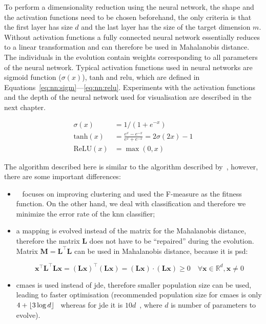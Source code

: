 \documentclass[12pt,a4paper]{report}
\begin{document}
To perform a dimensionality reduction using the neural network, the shape and the activation functions need to be chosen beforehand, the only criteria is that the first layer has size $d$ and the last layer has the size of the target dimension $m$. Without activation functions a fully connected neural network essentially reduces to a linear transformation and can therefore be used in Mahalanobis distance. The individuals in the evolution contain weights corresponding to all parameters of the neural network. Typical activation functions used in neural networks are sigmoid function ($\sigma(x)$), \ac{tanh} and \ac{relu}, which are defined in Equations~\ref{eq:nn:sigm}---\ref{eq:nn:relu}. Experiments with the activation functions and the depth of the neural network used for visualisation are described in the next chapter.

\begin{align}
\sigma(x)      &= 1/(1+e^{-x}) \label{eq:nn:sigm} \\
\text{tanh}(x) &= \frac{e^x-e^{-x}}{e^x+e^{-x}} = 2\sigma(2x)-1 \label{eq:nn:tanh} \\
\text{ReLU}(x) &= \max(0,x) \label{eq:nn:relu}
\end{align}

The algorithm described here is similar to the algorithm described by~\citep{fukui2013evolutionary}, however, there are some important differences:
\begin{itemize}
\item~\citep{fukui2013evolutionary} focuses on improving clustering and used the \mbox{F-measure} as the fitness function. On the other hand, we deal with classification and therefore we minimize the error rate of the \ac{knn} classifier;
\item a mapping is evolved instead of the matrix for the Mahalanobis distance, therefore the matrix $\bm{L}$ does not have to be ``repaired'' during the evolution. Matrix $\bm{M}=\bm{L}^\top\bm{L}$ can be used in Mahalanobis distance, because it is \ac{psd}:

\begin{equation}
\bm{x}^\top \bm{L}^\top\bm{L}\bm{x}=(\bm{Lx})^\top(\bm{Lx})=(\bm{Lx})\cdot (\bm{Lx})\geq 0 \quad \forall \bm{x} \in \mathbb{R}^d, \bm{x} \neq 0 \label{eq:mah:proof}
\end{equation}

\item \ac{cmaes} is used instead of \ac{jde}, therefore smaller population size can be used, leading to faster optimisation (recommended population size for \ac{cmaes} is only $4+\lfloor3\log{d}\rfloor$~\citep{hansen2006cma} whereas for \ac{jde} it is $10d$~\citep{brest2006self}, where $d$ is number of parameters to evolve).
\end{itemize}
\end{document}
